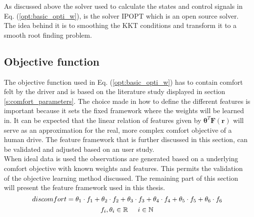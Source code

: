 As discussed above the solver used to calculate the states and control signals in Eq. (\ref{opt:basic_opti_w}), is the solver IPOPT which is an open source solver. The idea behind it is to smoothing the KKT conditions and transform it to a smooth root finding problem. \cite{Panos_opti} \\


\subsection{Objective function}\label{s:obj}
The objective function used in Eq. (\ref{opt:basic_opti_w}) has to contain comfort felt by the driver and is based on the literature study displayed in section \ref{s:comfort_parameters}. The choice made in how to define the different features is important because it sets the fixed framework where the weights will be learned in.  It can be expected that the linear relation of features given by $\bm{\theta}^T\bm{F}(\bm{r})$ will serve as an approximation for the real, more complex comfort objective of a human drive. The feature framework that is further discussed in this section, can be validated and adjusted based on an user study.\\


When ideal data is used the observations are generated based on a underlying comfort objective with known weights and features. This permits the validation of the objective learning method discussed. The remaining part of this section will present the feature framework used in this thesis.\\


\begin{equation}\label{eq:obj}
discomfort = \theta_1 \cdot f_1 +\theta_2 \cdot f_2 +\theta_3 \cdot f_3 +\theta_4 \cdot f_4 +\theta_5 \cdot f_5 +\theta_6 \cdot f_6 \\
\end{equation}
\[	f_i, \theta_i \in \mathbb{R} \hspace{5mm}
i \in \mathbb{N}\]


